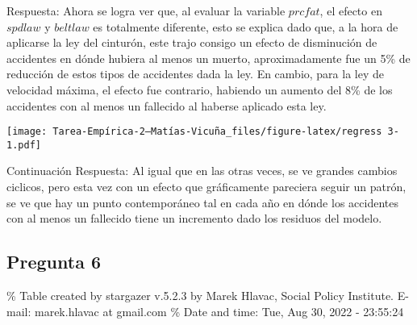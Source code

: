 \documentclass[
]{article}
\begin{document}
Respuesta: Ahora se logra ver que, al evaluar la variable \(prcfat\), el
efecto en \(spdlaw\) y \(beltlaw\) es totalmente diferente, esto se
explica dado que, a la hora de aplicarse la ley del cinturón, este trajo
consigo un efecto de disminución de accidentes en dónde hubiera al menos
un muerto, aproximadamente fue un 5\% de reducción de estos tipos de
accidentes dada la ley. En cambio, para la ley de velocidad máxima, el
efecto fue contrario, habiendo un aumento del 8\% de los accidentes con
al menos un fallecido al haberse aplicado esta ley.

\texttt{[image: Tarea-Empírica-2---Matías-Vicuña\_files/figure-latex/regress 3-1.pdf]}

Continuación Respuesta: Al igual que en las otras veces, se ve grandes
cambios ciclicos, pero esta vez con un efecto que gráficamente pareciera
seguir un patrón, se ve que hay un punto contemporáneo tal en cada año
en dónde los accidentes con al menos un fallecido tiene un incremento
dado los residuos del modelo.

\newpage

\hypertarget{pregunta-6}{%
\subsection{Pregunta 6}\label{pregunta-6}}

\% Table created by stargazer v.5.2.3 by Marek Hlavac, Social Policy
Institute. E-mail: marek.hlavac at gmail.com \% Date and time: Tue, Aug
30, 2022 - 23:55:24
\end{document}
